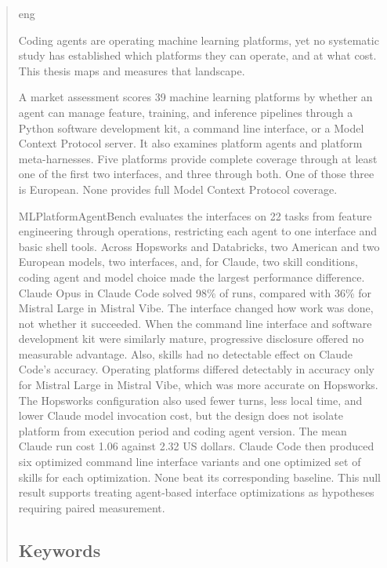 \documentclass[
english,                 %
bibtex,                  %
]{kththesis}
\numberwithin{listing}{chapter}
\begin{document}
\begin{abstract}
  \markboth{\abstractname}{}
\begin{scontents}[store-env=lang]
eng
\end{scontents}

\begin{scontents}[store-env=abstracts,print-env=true]

Coding agents are operating machine learning platforms, yet no systematic study has established which platforms they can operate, and at what cost. This thesis maps and measures that landscape.

A market assessment scores 39 machine learning platforms by whether an agent can manage feature, training, and inference pipelines through a Python software development kit, a command line interface, or a Model Context Protocol server. It also examines platform agents and platform meta-harnesses. Five platforms provide complete coverage through at least one of the first two interfaces, and three through both. One of those three is European. None provides full Model Context Protocol coverage.

MLPlatformAgentBench evaluates the interfaces on 22 tasks from feature engineering through operations, restricting each agent to one interface and basic shell tools. Across Hopsworks and Databricks, two American and two European models, two interfaces, and, for Claude, two skill conditions, coding agent and model choice made the largest performance difference. Claude Opus in Claude Code solved 98\% of runs, compared with 36\% for Mistral Large in Mistral Vibe. The interface changed how work was done, not whether it succeeded. When the command line interface and software development kit were similarly mature, progressive disclosure offered no measurable advantage. Also, skills had no detectable effect on Claude Code's accuracy. Operating platforms differed detectably in accuracy only for Mistral Large in Mistral Vibe, which was more accurate on Hopsworks. The Hopsworks configuration also used fewer turns, less local time, and lower Claude model invocation cost, but the design does not isolate platform from execution period and coding agent version. The mean Claude run cost 1.06 against 2.32 US dollars. Claude Code then produced six optimized command line interface variants and one optimized set of skills for each optimization. None beat its corresponding baseline. This null result supports treating agent-based interface optimizations as hypotheses requiring paired measurement.

\end{scontents}

\subsection*{Keywords}
\begin{scontents}[store-env=keywords,print-env=true]
\end{scontents}
\end{abstract}
\end{document}
